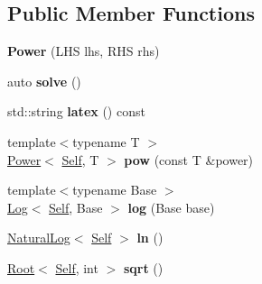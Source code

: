 \subsection*{Public Member Functions}
\begin{DoxyCompactItemize}
\item 
\hypertarget{classlatex_1_1math_1_1Power_aa1ae9542af69ce3135191362aa960510}{{\bfseries Power} (L\-H\-S lhs, R\-H\-S rhs)}\label{classlatex_1_1math_1_1Power_aa1ae9542af69ce3135191362aa960510}

\item 
\hypertarget{classlatex_1_1math_1_1Power_a4a6028011330ff0c13c8b3e101ea30db}{auto {\bfseries solve} ()}\label{classlatex_1_1math_1_1Power_a4a6028011330ff0c13c8b3e101ea30db}

\item 
\hypertarget{classlatex_1_1math_1_1Power_a70212b568439a2adfd36de89fd0278a5}{std\-::string {\bfseries latex} () const }\label{classlatex_1_1math_1_1Power_a70212b568439a2adfd36de89fd0278a5}

\item 
\hypertarget{classlatex_1_1math_1_1Power_a90703bd0ca39a517c51805562279d478}{{\footnotesize template$<$typename T $>$ }\\\hyperlink{classlatex_1_1math_1_1Power}{Power}$<$ \hyperlink{classlatex_1_1math_1_1Power}{Self}, T $>$ {\bfseries pow} (const T \&power)}\label{classlatex_1_1math_1_1Power_a90703bd0ca39a517c51805562279d478}

\item 
\hypertarget{classlatex_1_1math_1_1Power_ab2610dcc70d57172bc7db1223a65a57c}{{\footnotesize template$<$typename Base $>$ }\\\hyperlink{classlatex_1_1math_1_1Log}{Log}$<$ \hyperlink{classlatex_1_1math_1_1Power}{Self}, Base $>$ {\bfseries log} (Base base)}\label{classlatex_1_1math_1_1Power_ab2610dcc70d57172bc7db1223a65a57c}

\item 
\hypertarget{classlatex_1_1math_1_1Power_a77146b20ad35d31f6641df27cd54b4fd}{\hyperlink{classlatex_1_1math_1_1NaturalLog}{Natural\-Log}$<$ \hyperlink{classlatex_1_1math_1_1Power}{Self} $>$ {\bfseries ln} ()}\label{classlatex_1_1math_1_1Power_a77146b20ad35d31f6641df27cd54b4fd}

\item 
\hypertarget{classlatex_1_1math_1_1Power_aa590f686d39ea716b9dcd194a2f25871}{\hyperlink{classlatex_1_1math_1_1Root}{Root}$<$ \hyperlink{classlatex_1_1math_1_1Power}{Self}, int $>$ {\bfseries sqrt} ()}\label{classlatex_1_1math_1_1Power_aa590f686d39ea716b9dcd194a2f25871}

\end{DoxyCompactItemize}
